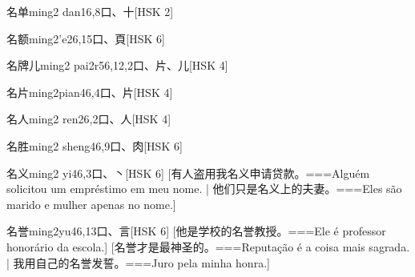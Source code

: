 \begin{EntryWithPhonetic}{名单}{ming2 dan1}{6,8}{⼝、⼗}[HSK 2]
\end{EntryWithPhonetic}

\begin{EntryWithPhonetic}{名额}{ming2'e2}{6,15}{⼝、⾴}[HSK 6]
\end{EntryWithPhonetic}

\begin{EntryWithPhonetic}{名牌儿}{ming2 pai2r5}{6,12,2}{⼝、⽚、⼉}[HSK 4]
\end{EntryWithPhonetic}

\begin{EntryWithPhonetic}{名片}{ming2pian4}{6,4}{⼝、⽚}[HSK 4]
\end{EntryWithPhonetic}

\begin{EntryWithPhonetic}{名人}{ming2 ren2}{6,2}{⼝、⼈}[HSK 4]
\end{EntryWithPhonetic}

\begin{EntryWithPhonetic}{名胜}{ming2 sheng4}{6,9}{⼝、⾁}[HSK 6]
\end{EntryWithPhonetic}

\begin{EntryWithPhonetic}{名义}{ming2 yi4}{6,3}{⼝、⼂}[HSK 6]
  [有人盗用我名义申请贷款。===Alguém solicitou um empréstimo em meu nome. | 他们只是名义上的夫妻。===Eles são marido e mulher apenas no nome.]
\end{EntryWithPhonetic}

\begin{EntryWithPhonetic}{名誉}{ming2yu4}{6,13}{⼝、⾔}[HSK 6]
  [他是学校的名誉教授。===Ele é professor honorário da escola.]
  [名誉才是最神圣的。===Reputação é a coisa mais sagrada. | 我用自己的名誉发誓。===Juro pela minha honra.]
\end{EntryWithPhonetic}

